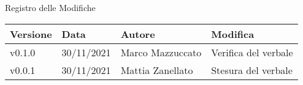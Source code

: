 \begin{center}
  \huge{Registro delle Modifiche}
\end{center}

\begin{center}
  \begin{tabular}{|p{2cm}|p{2cm}|p{3cm}|p{5cm}|}
    \hline
    \textbf{Versione} & \textbf{Data} & \textbf{Autore} & \textbf{Modifica}                    \\ \hline
    v0.1.0            & 30/11/2021    & Marco Mazzuccato   & Verifica del verbale \\ \hline
    v0.0.1            & 30/11/2021    & Mattia Zanellato   & Stesura del verbale \\ \hline
  \end{tabular}
\end{center}